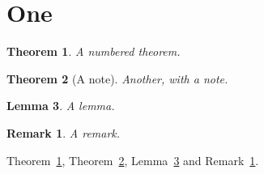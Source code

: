 \documentclass{article}
\newtheorem{theorem}{Theorem}
\newtheorem{lemma}[theorem]{Lemma}
\newtheorem{remark}{Remark}[section]
\begin{document}
\section{One}
\begin{theorem}\label{thm:one}A numbered theorem.\end{theorem}
\begin{theorem}[A note]\label{thm:note}Another, with a note.\end{theorem}
\begin{lemma}\label{lem:one}A lemma.\end{lemma}
\begin{remark}\label{rem:one}A remark.\end{remark}
Theorem~\ref{thm:one}, Theorem~\ref{thm:note}, Lemma~\ref{lem:one} and
Remark~\ref{rem:one}.
\end{document}
